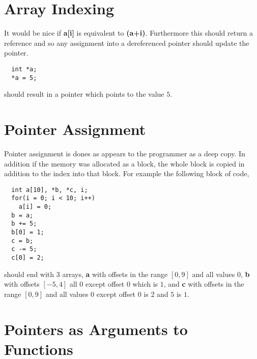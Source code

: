 %
%
%
%
\section{Array Indexing}
It would be nice if \textbf{a[i]} is equivalent to \textbf{\*(a+i)}. Furthermore this should return a reference and so any assignment into a dereferenced 
pointer should update the pointer.
\begin{verbatim}
  int *a;
  *a = 5;
\end{verbatim}
should result in a pointer which points to the value $5$.
\section{Pointer Assignment}
Pointer assignment is dones as appears to the programmer as a deep copy. In addition if the memory was allocated as a block, the whole block is copied in addition to the 
index into that block. For example the following block of code,
\begin{verbatim}
  int a[10], *b, *c, i;
  for(i = 0; i < 10; i++)
    a[i] = 0;
  b = a;
  b += 5;
  b[0] = 1;
  c = b;
  c -= 5;
  c[0] = 2;  
\end{verbatim}
should end with 3 arrays, \textbf{a} with offsets in the range $\left[0,9\right]$ and all values $0$, \textbf{b} with offsets $\left[-5,4\right]$ all $0$ except offset 
$0$ which is $1$, and \textbf{c} with offsets in the range $\left[0,9\right]$ and all values $0$ except offset $0$ is $2$ and $5$ is $1$.
\section{Pointers as Arguments to Functions}
